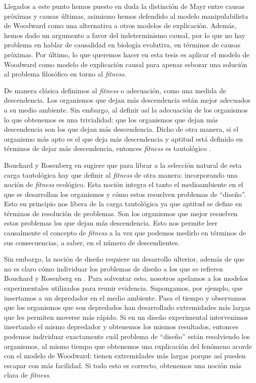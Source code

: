 Llegados a este punto hemos puesto en duda la distinción de Mayr entre causas próximas y causas últimas, asimismo hemos defendido al modelo manipulabilista de Woodward como una alternativa a otros modelos de explicación. Además, hemos dado un argumento a favor del indeterminismo causal, por lo que no hay problema en hablar de causalidad en biología evolutiva, en términos de causas próximas. Por último, lo que queremos hacer en esta tesis es aplicar el modelo de Woodward como modelo de explicación causal para apenas esbozar una solución al problema filosófico en torno al \emph{fitness}.

De manera clásica definimos al \emph{fitness} o adecuación, como una medida de descendencia. Los organismos que dejan más descendencia están mejor adecuados a su medio ambiente. Sin embargo, al definir así la adecuación de los organismos lo que obtenemos es una trivialidad: que los organismos que dejan más descendencia son los que dejan más descendencia. Dicho de otra manera, si el organismo más apto es el que deja más descendencia y aptitud está definido en términos de dejar más descendencia, entonces \emph{fitness} es tautológico \cite{Paul1992, sep-fitness}.

Bouchard y Rosenberg en \cite{Bouchard2004} sugiere que para librar a la selección natural de esta carga tautológica hay que definir al \emph{fitness} de otra manera: incorporando una noción de \emph{fitness} ecológico. Esta noción integra el tanto el medioambiente en el que se desarrollan los organismos y cómo estos resuelven problemas de ``diseño''. Esto en principio nos libera de la carga tautológica ya que aptitud se define en términos de resolución de problemas. Son los organismos que mejor resuelven estos problemas los que dejan más descendencia. Esto nos permite leer causalmente el concepto de \emph{fitness} a la vez que podemos medirlo en términos de sus consecuencias, a saber, en el número de descendientes.

Sin embargo, la noción de diseño requiere un desarrollo ulterior, además de que no es claro cómo individuar los problemas de diseño a los que se refieren Bouchard y Rosenberg en \citeyear{Bouchard2004}. Para solventar esto, nosotros apelamos a los modelos experimentales utilizados para reunir evidencia. Supongamos, por ejemplo, que insertamos a un depredador en el medio ambiente. Pasa el tiempo y observamos que los organismos que son depredados han desarrollado extremidades más largas que les permiten moverse más rápido. Si en un diseño experimental intervenimos insertando el mismo depredador y obtenemos los mismos resultados, entonces podemos individuar exactamente cuál problema de ``diseño'' están resolviendo los organismos, al mismo tiempo que obtenemos una explicación del fenómeno acorde con el modelo de Woodward: tienen extremidades más largas porque así pueden escapar con más facilidad. Si todo esto es correcto, obtenemos una noción más clara de \emph{fitness}.

